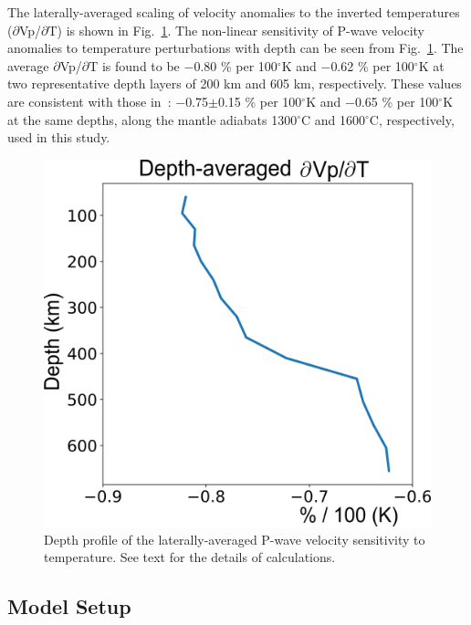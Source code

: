\documentclass[draft,linenumbers]{agujournal2018}
\begin{document}
The laterally-averaged scaling of velocity anomalies to the inverted temperatures ($\partial$Vp/$\partial$T) is shown in Fig.~\ref{fig_temp}. The non-linear sensitivity of P-wave velocity anomalies to temperature perturbations with depth can be seen from Fig.~\ref{fig_temp}. The average $\partial$Vp/$\partial$T is found to be $-$0.80 \% per 100$^\circ$K and $-$0.62 \% per 100$^\circ$K at two representative depth layers of 200 km and 605 km, respectively. These values are consistent with those in~\citet{Cammarano2003}: $-$0.75$\pm$0.15 \% per 100$^\circ$K and $-$0.65 \% per 100$^\circ$K at the same depths, along the mantle adiabats 1300$^{\circ}$C and 1600$^{\circ}$C, respectively, used in this study. 
%
\begin{figure}[ht]
    \centering
    \includegraphics[width=0.6\linewidth]{figures/depth_average.png}
    \caption{ Depth profile of the laterally-averaged P-wave velocity sensitivity to temperature. See text for the details of calculations.}
    \label{fig_temp}
 \end{figure}

\subsection{Model Setup}
    
\end{document}
